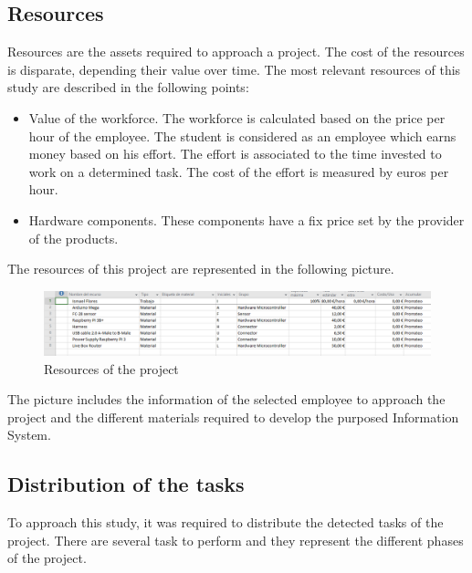 \subsection{Resources}

Resources are the assets required to approach a project. The cost of the resources is disparate, depending their value over time. The most relevant resources of this study are described in the following points:

\begin{itemize}

\item Value of the workforce. The workforce is calculated based on the price per hour of the employee. The student is considered as an employee which earns money based on his effort. The effort is associated to the time invested to work on a determined task. The cost of the effort is measured by euros per hour.
\item Hardware components. These components have a fix price set by the provider of the products.

\end{itemize}

The resources of this project are represented in the following picture.

\begin{figure}[H]
\begin{centering}
\includegraphics[scale=0.5]{IMGS/resources_project.PNG}
\caption{Resources of the project \label{Resources of the project}}
\end{centering}
\end{figure}

The picture includes the information of the selected employee to approach the project and the different materials required to develop the purposed Information System.

\subsection{Distribution of the tasks}

To approach this study, it was required to distribute the detected tasks of the project. There are several task to perform and they represent the different phases of the project.\\

